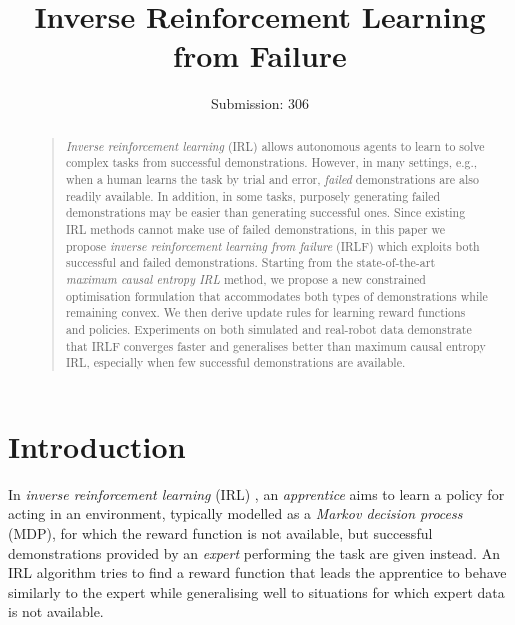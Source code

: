 \documentclass{aamas2016}
\begin{document}
%
\title{Inverse Reinforcement Learning from Failure}
\author{Submission: 306}
\maketitle
\begin{abstract}
\begin{quote}

\emph{Inverse reinforcement learning} (IRL) allows autonomous agents to learn to solve complex tasks from successful demonstrations.  However, in many settings, e.g., when a human learns the task by trial and error, \emph{failed} demonstrations are also readily available.  In addition, in some tasks, purposely generating failed demonstrations may be easier than generating successful ones.  Since existing IRL methods cannot make use of failed demonstrations, in this paper we propose \emph{inverse reinforcement learning from failure} (IRLF) which exploits both successful and failed demonstrations.  Starting from the state-of-the-art \emph{maximum causal entropy IRL} method, we propose a new constrained optimisation formulation that accommodates both types of demonstrations while remaining convex.  We then derive update rules for learning reward functions and policies. Experiments on both simulated and real-robot data demonstrate that IRLF converges faster and generalises better than maximum causal entropy IRL, especially when few successful demonstrations are available.

\end{quote}
\end{abstract}

\section{Introduction}

In \emph{inverse reinforcement learning} (IRL) \cite{ng2000algorithms}, an \emph{apprentice} aims to learn a policy for acting in an environment, typically modelled as a \emph{Markov decision process} (MDP), for which the reward function is not available, but successful demonstrations provided by an \emph{expert} performing the task are given instead. An IRL algorithm tries to find a reward function that leads the apprentice to behave  similarly to the expert while generalising well to situations for which expert data is not available. 
\end{document}
